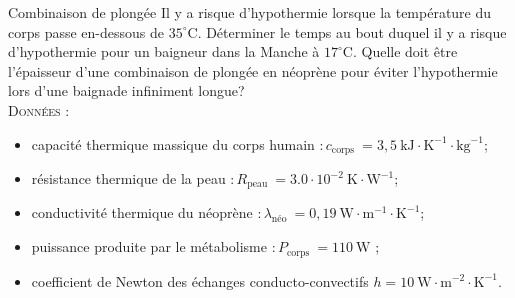 \begin{exo}[PC][1][oral]{Combinaison de plongée}
Il y a risque d'hypothermie lorsque la température du corps passe en-dessous de $35^{\circ} \mathrm{C}$.
Déterminer le temps au bout duquel il y a risque d'hypothermie pour un baigneur dans la Manche à $17^{\circ} \mathrm{C}$. Quelle doit être l'épaisseur d'une combinaison de plongée en néoprène pour éviter l'hypothermie lors d'une baignade infiniment longue?\\

\textsc{Données} :
\begin{itemize}
  \item[$\triangleright$] capacité thermique massique du corps humain $: c_{\text {corps }}=3,5 \mathrm{~kJ} \cdot \mathrm{K}^{-1} \cdot \mathrm{kg}^{-1}$;
  \item[$\triangleright$] résistance thermique de la peau $: R_{\text {peau }}=3.0 \cdot 10^{-2} \mathrm{~K} \cdot \mathrm{W}^{-1}$;
  \item[$\triangleright$] conductivité thermique du néoprène $: \lambda_{\text {néo }}=0,19 \mathrm{~W} \cdot \mathrm{m}^{-1} \cdot \mathrm{K}^{-1}$;
  \item[$\triangleright$] puissance produite par le métabolisme $: P_{\text {corps }}=110 \mathrm{~W}$ ;
  \item[$\triangleright$] coefficient de Newton des échanges conducto-convectifs $h=10 \mathrm{~W} \cdot \mathrm{m}^{-2} \cdot \mathrm{K}^{-1}$.
\end{itemize}


\end{exo}
